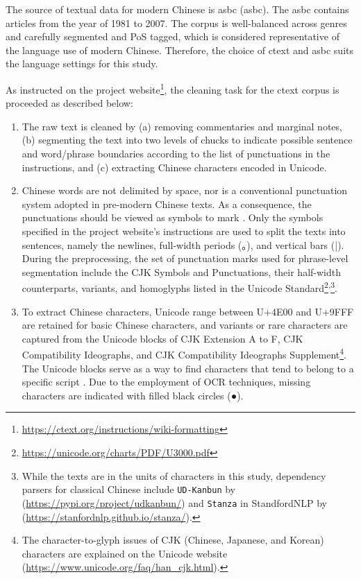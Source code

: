 The source of textual data for modern Chinese is \acrlong{asbc} (\acrshort{asbc}). The \gls{asbc} contains articles from the year of 1981 to 2007. The corpus is well-balanced across genres and carefully segmented and PoS tagged, which is considered representative of the language use of modern Chinese. Therefore, the choice of \gls{ctext} and \gls{asbc} suits the language settings for this study.

As instructed on the project website\footnote{\url{https://ctext.org/instructions/wiki-formatting}}, the cleaning task for the \gls{ctext} corpus is proceeded as described below:

\begin{enumerate}[label={(\arabic*)},nolistsep]
    \item The raw text is cleaned by (a) removing commentaries and marginal notes, (b) segmenting the text into two levels of chucks to indicate possible sentence and word/phrase boundaries according to the list of punctuations in the instructions, and (c) extracting Chinese characters encoded in Unicode.
    \item Chinese words are not delimited by space, nor is a conventional punctuation system adopted in pre-modern Chinese texts. As a consequence, the punctuations should be viewed as symbols to mark . Only the symbols specified in the project website's instructions are used to split the texts into sentences, namely the newlines, full-width periods (。), and vertical bars (|). During the preprocessing, the set of punctuation marks used for phrase-level segmentation include the CJK Symbols and Punctuations, their half-width counterparts, variants, and homoglyphs listed in the Unicode Standard\footnote{\url{https://unicode.org/charts/PDF/U3000.pdf}}\textsuperscript{,}\footnote{While the texts are in the units of characters in this study, dependency parsers for classical Chinese include \texttt{UD-Kanbun} by \textcite{yasuoka2019universal} (\url{https://pypi.org/project/udkanbun/}) and \texttt{Stanza} in StandfordNLP by \textcite{qi2020stanza} (\url{https://stanfordnlp.github.io/stanza/}).}.
    \item To extract Chinese characters, Unicode range between U+4E00 and U+9FFF are retained for basic Chinese characters, and variants or rare characters are captured from the Unicode blocks of CJK Extension A to F, CJK Compatibility Ideographs, and CJK Compatibility Ideographs Supplement\footnote{The character-to-glyph issues of CJK (Chinese, Japanese, and Korean) characters are explained on the Unicode website (\url{https://www.unicode.org/faq/han_cjk.html}).}. The Unicode blocks serve as a way to find characters that tend to belong to a specific script \parencite{moran2018unicode}. Due to the employment of OCR techniques, missing characters are indicated with filled black circles (●).

\end{enumerate}
